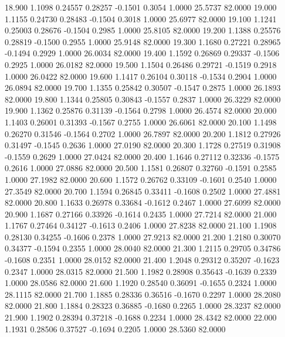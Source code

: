   18.900   1.1098   0.24557   0.28257  -0.1501   0.3054   1.0000  25.5737  82.0000
  19.000   1.1155   0.24730   0.28483  -0.1504   0.3018   1.0000  25.6977  82.0000
  19.100   1.1241   0.25003   0.28676  -0.1504   0.2985   1.0000  25.8105  82.0000
  19.200   1.1388   0.25576   0.28819  -0.1500   0.2955   1.0000  25.9148  82.0000
  19.300   1.1680   0.27221   0.28965  -0.1494   0.2929   1.0000  26.0034  82.0000
  19.400   1.1592   0.26869   0.29337  -0.1506   0.2925   1.0000  26.0182  82.0000
  19.500   1.1504   0.26486   0.29721  -0.1519   0.2918   1.0000  26.0422  82.0000
  19.600   1.1417   0.26104   0.30118  -0.1534   0.2904   1.0000  26.0894  82.0000
  19.700   1.1355   0.25842   0.30507  -0.1547   0.2875   1.0000  26.1893  82.0000
  19.800   1.1344   0.25805   0.30843  -0.1557   0.2837   1.0000  26.3229  82.0000
  19.900   1.1362   0.25876   0.31139  -0.1564   0.2798   1.0000  26.4574  82.0000
  20.000   1.1403   0.26001   0.31393  -0.1567   0.2755   1.0000  26.6061  82.0000
  20.100   1.1498   0.26270   0.31546  -0.1564   0.2702   1.0000  26.7897  82.0000
  20.200   1.1812   0.27926   0.31497  -0.1545   0.2636   1.0000  27.0190  82.0000
  20.300   1.1728   0.27519   0.31908  -0.1559   0.2629   1.0000  27.0424  82.0000
  20.400   1.1646   0.27112   0.32336  -0.1575   0.2616   1.0000  27.0886  82.0000
  20.500   1.1581   0.26807   0.32760  -0.1591   0.2585   1.0000  27.1982  82.0000
  20.600   1.1572   0.26762   0.33109  -0.1601   0.2540   1.0000  27.3549  82.0000
  20.700   1.1594   0.26845   0.33411  -0.1608   0.2502   1.0000  27.4881  82.0000
  20.800   1.1633   0.26978   0.33684  -0.1612   0.2467   1.0000  27.6099  82.0000
  20.900   1.1687   0.27166   0.33926  -0.1614   0.2435   1.0000  27.7214  82.0000
  21.000   1.1767   0.27464   0.34127  -0.1613   0.2406   1.0000  27.8238  82.0000
  21.100   1.1908   0.28130   0.34255  -0.1606   0.2378   1.0000  27.9213  82.0000
  21.200   1.2180   0.30070   0.34377  -0.1594   0.2355   1.0000  28.0040  82.0000
  21.300   1.2115   0.29705   0.34786  -0.1608   0.2351   1.0000  28.0152  82.0000
  21.400   1.2048   0.29312   0.35207  -0.1623   0.2347   1.0000  28.0315  82.0000
  21.500   1.1982   0.28908   0.35643  -0.1639   0.2339   1.0000  28.0586  82.0000
  21.600   1.1920   0.28540   0.36091  -0.1655   0.2324   1.0000  28.1115  82.0000
  21.700   1.1885   0.28336   0.36516  -0.1670   0.2297   1.0000  28.2080  82.0000
  21.800   1.1884   0.28323   0.36885  -0.1680   0.2265   1.0000  28.3237  82.0000
  21.900   1.1902   0.28394   0.37218  -0.1688   0.2234   1.0000  28.4342  82.0000
  22.000   1.1931   0.28506   0.37527  -0.1694   0.2205   1.0000  28.5360  82.0000
